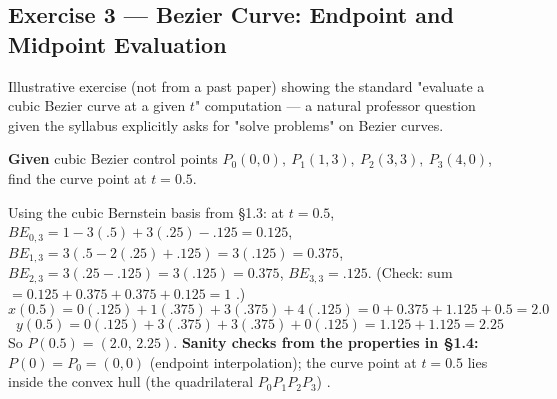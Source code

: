 \documentclass[12pt, a4paper]{article}
\newenvironment{solutionbox}{\begin{mdframed}[style=solutionframe]}{\end{mdframed}}
\newenvironment{answerbox}{\begin{mdframed}[style=answerframe]}{\end{mdframed}}
\newenvironment{notesbox}{\begin{mdframed}[style=notesframe]}{\end{mdframed}}
\begin{document}
\subsection*{Exercise 3 --- Bezier Curve: Endpoint and Midpoint Evaluation}
\begin{notesbox}
Illustrative exercise (not from a past paper) showing the standard "evaluate a cubic Bezier curve at a given $t$" computation --- a natural professor question given the syllabus explicitly asks for "solve problems" on Bezier curves.
\end{notesbox}
\begin{solutionbox}
\textbf{Given} cubic Bezier control points $P_0(0,0),\ P_1(1,3),\ P_2(3,3),\ P_3(4,0)$, find the curve point at $t=0.5$.
\end{solutionbox}
\begin{answerbox}
Using the cubic Bernstein basis from \S1.3: at $t=0.5$, $BE_{0,3}=1-3(.5)+3(.25)-.125=0.125$, $BE_{1,3}=3(.5-2(.25)+.125)=3(.125)=0.375$, $BE_{2,3}=3(.25-.125)=3(.125)=0.375$, $BE_{3,3}=.125$. (Check: sum $=0.125+0.375+0.375+0.125=1$ \checkmark.)
$$x(0.5) = 0(.125)+1(.375)+3(.375)+4(.125) = 0+0.375+1.125+0.5 = 2.0$$
$$y(0.5) = 0(.125)+3(.375)+3(.375)+0(.125) = 1.125+1.125 = 2.25$$
So $P(0.5)=(2.0,\,2.25)$. \textbf{Sanity checks from the properties in \S1.4:} $P(0)=P_0=(0,0)$ \checkmark (endpoint interpolation); the curve point at $t=0.5$ lies inside the convex hull (the quadrilateral $P_0P_1P_2P_3$) \checkmark.
\end{answerbox}

\end{document}
